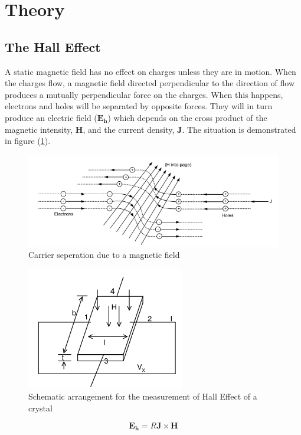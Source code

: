 \documentclass[%
 aip,
 amsmath,amssymb,
 reprint,%
]{revtex4-1}
\begin{document}
\section{Theory}
    \subsection{The Hall Effect}
    A static magnetic field has no effect on charges unless they are in motion. When the charges flow, a magnetic field directed perpendicular to the direction of
    flow produces a mutually perpendicular force on the charges. When this happens, electrons
    and holes will be separated by opposite forces. They will in turn produce an electric field ($\bm{E_h}$) which depends on the cross product of the magnetic intensity, $\bm{H}$, and the current density, $\bm{J}$. The situation is demonstrated in figure (\ref{fig:carrsep}).
    \begin{figure}
        \centering
        \includegraphics[scale = 0.62]{Figures/carr-sep-H.png}
        \caption{Carrier seperation due to a magnetic field}
        \label{fig:carrsep}
    \end{figure}
    \begin{figure}
        \centering
        \includegraphics{Figures/hall-schematic.png}
        \caption{Schematic arrangement for the
measurement of Hall Effect of a crystal}
        \label{fig:my_label}
    \end{figure}
    \begin{equation}
        \bm{E_h} = R \bm{J} \times \bm{H}
    \end{equation}
\end{document}
